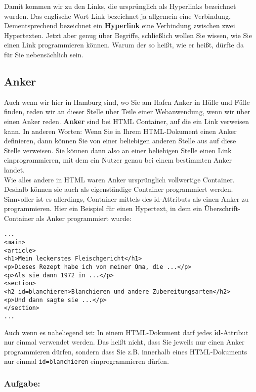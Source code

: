 Damit kommen wir zu den Links, die ursprünglich als Hyperlinks bezeichnet wurden. Das englische Wort Link bezeichnet ja allgemein eine Verbindung. Dementsprechend bezeichnet ein \textbf{Hyperlink} eine Verbindung zwischen zwei Hypertexten. Jetzt aber genug über Begriffe, schließlich wollen Sie wissen, wie Sie einen Link programmieren können. Warum der so heißt, wie er heißt, dürfte da für Sie nebensächlich sein.

\subsection{Anker}

Auch wenn wir hier in Hamburg sind, wo Sie am Hafen Anker in Hülle und Fülle finden, reden wir an dieser Stelle über Teile einer Webanwendung, wenn wir über einen Anker reden. \textbf{Anker} sind bei HTML Container, auf die ein Link verweisen kann. In anderen Worten: Wenn Sie in Ihrem HTML-Dokument einen Anker definieren, dann können Sie von einer beliebigen anderen Stelle aus auf diese Stelle verweisen. Sie können dann also an einer beliebigen Stelle einen Link einprogrammieren, mit dem ein Nutzer genau bei einem bestimmten Anker landet.\\

Wie alles andere in HTML waren Anker ursprünglich vollwertige Container. Deshalb können sie auch als eigenständige Container programmiert werden. Sinnvoller ist es allerdings, Container mittels des id-Attributs als einen Anker zu programmieren. Hier ein Beispiel für einen Hypertext, in dem ein Überschrift-Container als Anker programmiert wurde:

\begin{verbatim}
...
<main>
<article>
<h1>Mein leckerstes Fleischgericht</h1>
<p>Dieses Rezept habe ich von meiner Oma, die ...</p>
<p>Als sie dann 1972 in ...</p>
<section>
<h2 id=blanchieren>Blanchieren und andere Zubereitungsarten</h2>
<p>Und dann sagte sie ...</p>
</section>
... 
\end{verbatim}

Auch wenn es naheliegend ist: In einem HTML-Dokument darf jedes \textbf{id}-Attribut nur einmal verwendet werden. Das heißt nicht, dass Sie jeweils nur einen Anker programmieren dürfen, sondern dass Sie z.B. innerhalb eines HTML-Dokuments nur einmal \verb|id=blanchieren| einprogrammieren dürfen.

\subsubsection{Aufgabe:}

